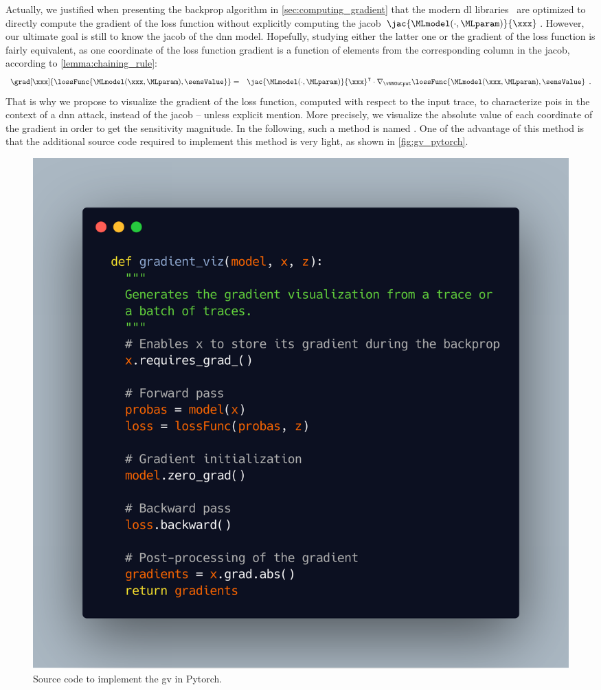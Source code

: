 Actually, we justified when presenting the backprop algorithm in \autoref{sec:computing_gradient} that the modern \gls{dl} libraries~\cite{pytorch_2019,tensorflow2015-whitepaper} are optimized to directly compute the gradient of the loss function without explicitly computing the \gls{jacob} \(\jac{\MLmodel(\cdot, \MLparam)}{\xxx}\).
However, our ultimate goal is still to know the \gls{jacob} of the \gls{dnn} model.
Hopefully, studying either the latter one or the gradient of the loss function is fairly equivalent, as one coordinate of the loss function gradient is a function of elements from the corresponding column in the \gls{jacob}, according to \autoref{lemma:chaining_rule}:
\begin{eqnarray}
	\grad[\xxx]{\lossFunc{\MLmodel(\xxx, \MLparam), \sensValue}} & = &
	\jac{\MLmodel(\cdot, \MLparam)}{\xxx}^\intercal \cdot \nabla_{\vNNOutput}\lossFunc{\MLmodel(\xxx, \MLparam),
	\sensValue} \enspace .
\end{eqnarray} 
That is why we propose to visualize the gradient of the loss function, computed with respect to the input trace, to characterize \glspl{poi} in the context of a \gls{dnn} attack, instead of the \gls{jacob} -- unless explicit mention. 
More precisely, we visualize the absolute value of each coordinate of the gradient  in order to get the sensitivity magnitude. 
In the following, such a method is named .
One of the advantage of this method is that the additional source code required to implement this method is very light, as shown in \autoref{fig:gv_pytorch}.

\begin{figure}
	\centering
	\includegraphics[width = 0.7 \textwidth]{figures/Illustrations/code}
	\caption{Source code to implement the \gls{gv} in \textsf{Pytorch}.}
	\label{fig:gv_pytorch}
\end{figure}

